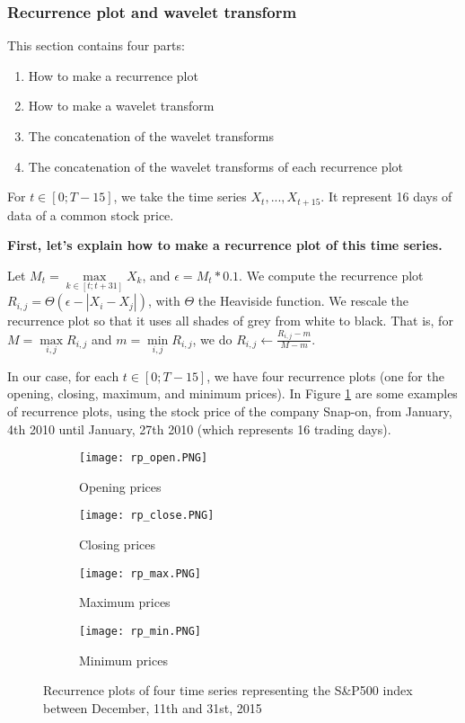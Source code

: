 \documentclass[11pt]{article}
\begin{document}
\begin{onehalfspace}
\subsubsection{Recurrence plot and wavelet transform}

This section contains four parts:

\begin{enumerate}
    \item How to make a recurrence plot
    \item How to make a wavelet transform
    \item The concatenation of the wavelet transforms
    \item The concatenation of the wavelet transforms of each recurrence plot 
\end{enumerate}

For $t \in [0; T-15]$, we take the time series $X_t, ..., X_{t+15}$. It represent 16 days of data of a common stock price.

\noindent \textbf{First, let's explain how to make a recurrence plot of this time series.}

Let $M_t = \max\limits_{k \in [t;t+31]} X_k$, and $\epsilon = M_t * 0.1$. We compute the recurrence plot $R_{i,j} = \Theta (\epsilon - |X_i - X_j|)$, with $\Theta$ the Heaviside function. We rescale the recurrence plot so that it uses all shades of grey from white to black. That is, for $M = \max\limits_{i,j} R_{i,j}$ and $m = \min\limits_{i,j} R_{i,j}$, we do $R_{i,j} \leftarrow \frac{R_{i,j} - m }{M - m }$. 

In our case, for each $t \in [0; T-15]$, we have four recurrence plots (one for the opening, closing, maximum, and minimum prices). In Figure \ref{fig:rec_plot} are some examples of recurrence plots, using the stock price of the company Snap-on, from January, 4th 2010 until January, 27th 2010 (which represents 16 trading days). 

\begin{figure}[h!]
    \centering
    \captionsetup{justification=centering}
    \begin{subfigure}{0.24\textwidth}
        \texttt{[image: rp\_open.PNG]}
        \caption{Opening prices}
    \end{subfigure}
    \begin{subfigure}{0.24\textwidth}
        \texttt{[image: rp\_close.PNG]}
        \caption{Closing prices}
    \end{subfigure}
    \begin{subfigure}{0.24\textwidth}
        \texttt{[image: rp\_max.PNG]}
        \caption{Maximum prices}
    \end{subfigure}    
    \begin{subfigure}{0.24\textwidth}
        \texttt{[image: rp\_min.PNG]}
        \caption{Minimum prices}
    \end{subfigure}
    \caption{Recurrence plots of four time series representing the S\&P500 index between December, 11th and 31st, 2015}
    \label{fig:rec_plot}
\end{figure}


\end{onehalfspace}
\end{document}
